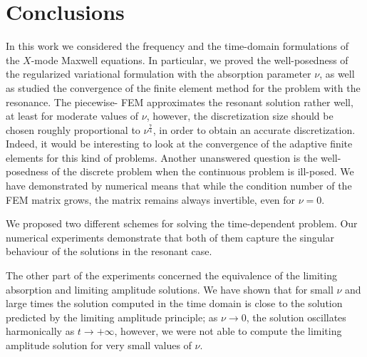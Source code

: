 \section{Conclusions}
In this work we considered the frequency  and the time-domain formulations of the $X$-mode Maxwell equations. 
In particular, we proved the well-posedness of the regularized variational formulation with
the absorption parameter $\nu$, as 
well as studied the convergence of the finite element method for the problem with the resonance. 
The piecewise- FEM approximates the resonant solution rather well, at least for moderate values of $\nu$, 
however, the discretization size should be chosen roughly proportional to $\nu^{\frac{7}{4}}$, in order to obtain an accurate discretization.
Indeed, it would be interesting to look at the convergence of the adaptive finite elements for this kind of problems. 
Another unanswered question is the well-posedness of the discrete problem when the continuous problem is ill-posed. We have 
demonstrated by numerical means that while the condition number of the FEM matrix grows, the matrix remains always invertible, even for $\nu=0$. 

We proposed two different schemes for solving the time-dependent problem. 
Our numerical experiments demonstrate that both of them capture the singular behaviour of the solutions in the resonant case.

The other part of the experiments concerned the equivalence of the limiting absorption and limiting amplitude solutions. We have shown 
that for small $\nu$ and large times the solution computed in the time domain is close to the solution predicted by the limiting amplitude principle; as 
$\nu\rightarrow 0$, the solution oscillates harmonically as $t\rightarrow +\infty$, however, we were not able to compute the limiting amplitude solution for very 
small values of $\nu$. 
